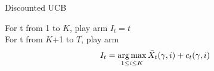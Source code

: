 \begin{algorithm}
    \caption{Discounted UCB}
    \label{alg:d_ucb}
    For t from 1 to $K$, play arm $I_t = t$ \\
    For t from $K$+1 to $T$, play arm 
    $$ I_t = \operatorname*{arg\,max}_{1\leq i \leq K} \bar X_t(\gamma,i) + c_t(\gamma,i)$$

\end{algorithm}